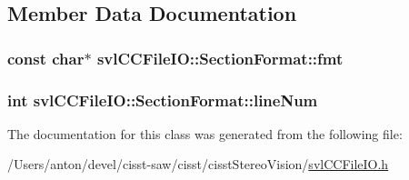 \subsection{Member Data Documentation}
\hypertarget{classsvl_c_c_file_i_o_1_1_section_format_a9b2eefac76715cdabfb228c19fdc814d}{}
\subsubsection[{fmt}]{\setlength{\rightskip}{0pt plus 5cm}const char$\ast$ svl\+C\+C\+File\+I\+O\+::\+Section\+Format\+::fmt}\label{classsvl_c_c_file_i_o_1_1_section_format_a9b2eefac76715cdabfb228c19fdc814d}
\hypertarget{classsvl_c_c_file_i_o_1_1_section_format_a8eb87a3ef3a4d4748edae1fb7af6df36}{}
\subsubsection[{line\+Num}]{\setlength{\rightskip}{0pt plus 5cm}int svl\+C\+C\+File\+I\+O\+::\+Section\+Format\+::line\+Num}\label{classsvl_c_c_file_i_o_1_1_section_format_a8eb87a3ef3a4d4748edae1fb7af6df36}


The documentation for this class was generated from the following file\+:\begin{DoxyCompactItemize}
\item 
/\+Users/anton/devel/cisst-\/saw/cisst/cisst\+Stereo\+Vision/\hyperlink{svl_c_c_file_i_o_8h}{svl\+C\+C\+File\+I\+O.\+h}\end{DoxyCompactItemize}
